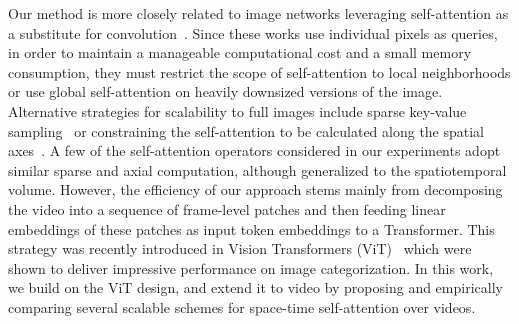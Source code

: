 \documentclass{article}
\begin{document}
Our method is more closely related to image networks leveraging self-attention as a substitute for convolution~\cite{Parmar:ICML2018, Ramachandran:NeurIPS2019, Cordonnier:ICLR2020, Zhao:CVPR2020}. Since these works use individual pixels as queries, in order to maintain a manageable computational cost and a small memory consumption, they must restrict the scope of self-attention to local neighborhoods or use global self-attention on heavily downsized versions of the image. Alternative strategies for scalability to full images include sparse key-value sampling~\cite{Child:OpenAI} or constraining the self-attention to be calculated along the spatial axes~\cite{Ho:Axial, huang2018ccnet, Wang:Axial}. A few of the self-attention operators considered in our experiments adopt similar sparse and axial computation, although generalized to the spatiotemporal volume. However, the efficiency of our approach stems mainly from decomposing the video into a sequence of frame-level patches and then feeding linear embeddings of these patches as input token embeddings to a Transformer. This strategy was recently introduced in Vision Transformers (ViT)~\cite{Dosovitskiy:ICLR2021} which were shown to deliver impressive performance on image categorization. In this work, we build on the ViT design, and extend it to video by proposing and empirically comparing several scalable schemes for space-time self-attention over videos.








\end{document}
